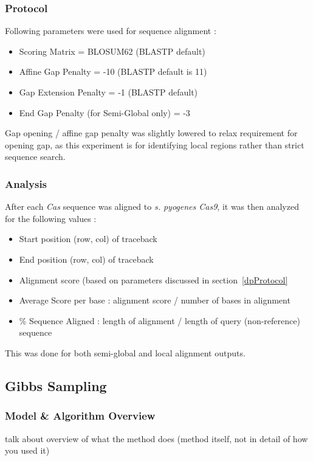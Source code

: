 \documentclass[11pt, oneside]{article}
\begin{document}
\subsubsection{Protocol} 
Following parameters were used for sequence alignment :
\begin{itemize}
\item Scoring Matrix = BLOSUM62 (BLASTP default)
\item Affine Gap Penalty = -10 (BLASTP default is 11)
\item Gap Extension Penalty = -1 (BLASTP default)
\item End Gap Penalty (for Semi-Global only) = -3
\end{itemize}

Gap opening / affine gap penalty was slightly lowered to relax requirement for opening gap, as this experiment is for identifying local regions rather than strict sequence search.


\subsubsection{Analysis}

After each \textit{Cas} sequence was aligned to \textit{s. pyogenes Cas9}, it was then analyzed for the following values :
\begin{itemize}
\item Start position (row, col) of traceback
\item End position (row, col) of traceback
\item Alignment score (based on parameters discussed in section~\ref{dpProtocol}
\item Average Score per base : alignment score / number of bases in alignment
\item \% Sequence Aligned : length of alignment / length of query (non-reference) sequence
\end{itemize}

This was done for both semi-global and local alignment outputs. 


\subsection{Gibbs Sampling}

\subsubsection{Model \& Algorithm Overview}
talk about overview of what the method does (method itself, not in detail of how you used it)
\end{document}
